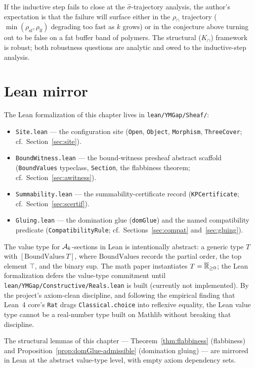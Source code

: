 \begin{conjecture}
If the inductive step fails to close at the $\widehat\sigma$-trajectory analysis, the author's expectation is that the failure will surface either in the $\rho_{\cap}$ trajectory ($\min(\rho_{\mathrm{sf}}, \rho_{\mathrm{lf}})$ degrading too fast as $k$ grows) or in the conjecture above turning out to be false on a fat buffer band of polymers.  The structural ($K_{\cap}$) framework is robust; both robustness questions are analytic and owed to the inductive-step analysis.
\end{conjecture}

\section{Lean mirror}
\label{sec:lean}

The Lean formalization of this chapter lives in \texttt{lean/YMGap/Sheaf/}:
\begin{itemize}
  \item \texttt{Site.lean} --- the configuration site (\texttt{Open}, \texttt{Object}, \texttt{Morphism}, \texttt{ThreeCover}; cf.\ Section~\ref{sec:site}).
  \item \texttt{BoundWitness.lean} --- the bound-witness presheaf abstract scaffold (\texttt{BoundValues} typeclass, \texttt{Section}, the flabbiness theorem; cf.\ Section~\ref{sec:awitness}).
  \item \texttt{Summability.lean} --- the summability-certificate record (\texttt{KPCertificate}; cf.\ Section~\ref{sec:scertif}).
  \item \texttt{Gluing.lean} --- the domination glue (\texttt{domGlue}) and the named compatibility predicate (\texttt{CompatibilityRule}; cf.\ Sections~\ref{sec:compat} and~\ref{sec:gluing}).
\end{itemize}
The value type for $\mathcal{A}_k$-sections in Lean is intentionally abstract: a generic type $T$ with $[\mathrm{BoundValues}\ T]$, where $\mathrm{BoundValues}$ records the partial order, the top element $\top$, and the binary sup.  The math paper instantiates $T = \overline{\mathbb{R}}_{\ge 0}$; the Lean formalization defers the value-type commitment until \texttt{lean/YMGap/Constructive/Reals.lean} is built (currently not implemented).  By the project's axiom-clean discipline, and following the empirical finding that Lean~4 core's \texttt{Rat} drags \texttt{Classical.choice} into reflexive equality, the Lean value type cannot be a real-number type built on Mathlib without breaking that discipline.

The structural lemmas of this chapter --- Theorem~\ref{thm:flabbiness} (flabbiness) and Proposition~\ref{prop:domGlue-admissible} (domination gluing) --- are mirrored in Lean at the abstract value-type level, with empty axiom dependency sets.


